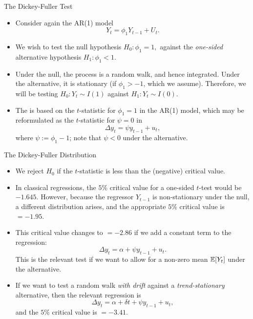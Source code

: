\begin{frame}{The Dickey-Fuller Test}
\begin{itemize}
\item Consider again the AR(1) model
\begin{equation*}
Y_t = \phi_1 Y_{t-1} + U_t .
\end{equation*}
\item We wish to test the null hypothesis
$
H_0: \phi_1 = 1 ,
$
against the \emph{\color{red}one-sided} alternative hypothesis
$
H_1: \phi_1 <1 .
$

\item Under the null, the process is a random walk, and hence
integrated. Under the alternative, it is stationary (if $\phi_1 >-1$,
which we assume). Therefore, we will be testing $H_{0}:Y_{t}\sim
I(1)$ against $H_{1}:Y_{t}\sim I(0)$.

\item  The  is
based on the $t$-statistic for $\phi_1 =1$ in the AR(1) model, which may be
reformulated as the $t$-statistic for $\psi =0$ in
\begin{equation*}
\Delta y_{t}=\psi y_{t-1}+u_{t},
\end{equation*}%
where $\psi :=\phi_1 -1$; note that $\psi <0$ under the alternative.

\end{itemize}
\end{frame}
\begin{frame}{The Dickey-Fuller Distribution}
\begin{itemize}
\item  We reject $H_{0}$ if the $t$-statistic is less than the
(negative) critical value.

\item In classical regressions, the $5\%$ critical value for a one-sided $t$-test
would be $-1.645$. However, because the regressor $Y_{t-1}$ is
non-stationary under the null, a different distribution arises,
and the appropriate $5\%$ critical value is $= -1.95$.

\item This critical value changes to $= -2.86$ if we add a
constant term to the regression:
\begin{equation*}
\Delta y_t = \alpha+ \psi y_{t-1}   + u_t.
\end{equation*}
This is the relevant
test if we want to allow for a non-zero mean ${\mathbb E}[Y_t]$ under the
alternative.

\item  If we want to test a random walk \emph{\color{red}with
drift} against a \emph{\color{red}trend-stationary} alternative, then the
relevant regression is
\begin{equation*}
\Delta y_t = \alpha+\delta t+\psi y_{t-1}  + u_t,
\end{equation*}
and the $5\%$ critical value is $= -3.41$.
\end{itemize}
\end{frame}
